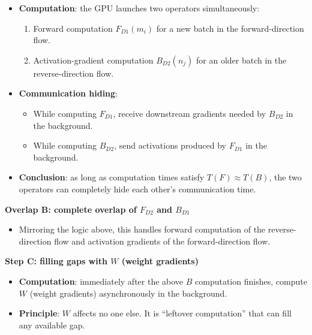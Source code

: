 \begin{itemize}
\tightlist
\item
{}
  \textbf{Computation}: the GPU launches two operators simultaneously:

  \begin{enumerate}
  \def\labelenumi{\arabic{enumi}.}
  \tightlist
  \item
    Forward computation \(F_{D1}(m_i)\) for a new batch in the forward-direction flow.
  \item
    Activation-gradient computation \(B_{D2}(n_j)\) for an older batch in the reverse-direction flow.
  \end{enumerate}
\item
{}
  \textbf{Communication hiding}:

  \begin{itemize}
  \tightlist
  \item
    While computing \(F_{D1}\), receive downstream gradients needed by \(B_{D2}\) in the background.
  \item
    While computing \(B_{D2}\), send activations produced by \(F_{D1}\) in the background.
  \end{itemize}
\item
  \textbf{Conclusion}: as long as computation times satisfy \(T(F) \approx T(B)\), the two operators can completely hide each other's communication time.
\end{itemize}

\textbf{Overlap B: complete overlap of \(F_{D2}\) and \(B_{D1}\)}

\begin{itemize}
\tightlist
\item
  Mirroring the logic above, this handles forward computation of the reverse-direction flow and activation gradients of the forward-direction flow.
\end{itemize}

\textbf{Step C: filling gaps with \(W\) (weight gradients)}

\begin{itemize}
\tightlist
\item
  \textbf{Computation}: immediately after the above \(B\) computation finishes, compute \(W\) (weight gradients) asynchronously in the background.
\item
  \textbf{Principle}: \(W\) affects no one else. It is ``leftover computation'' that can fill any available gap.
\end{itemize}

